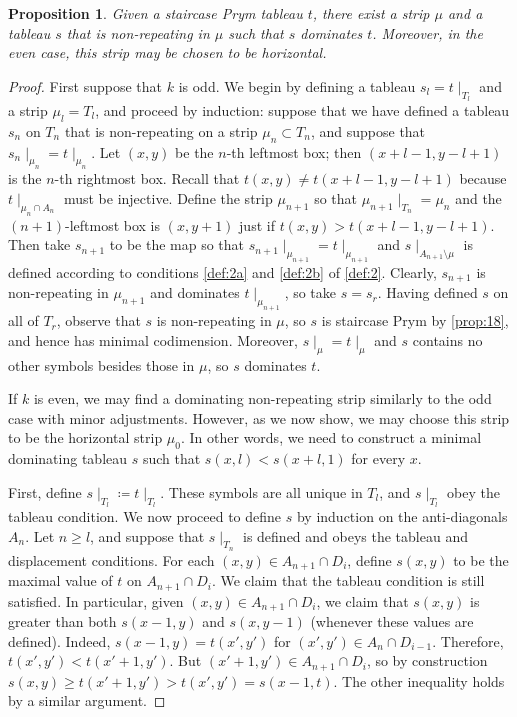 \documentclass[11pt,reqno]{amsart}
\newcommand*{\restrict}[1]{{\mid}_{#1}}
\theoremstyle{definition}
\theoremstyle{problem}
\theoremstyle{plain}
\newtheorem{proposition}[definition]{Proposition}
\theoremstyle{remark}
\theoremstyle{theorem}
\numberwithin{equation}{section}
\numberwithin{figure}{section}
\begin{document}
\begin{proposition}\label{prop:14}
  Given a staircase Prym tableau $t$, there exist a strip $\mu$ and a
  tableau $s$ that is non-repeating in $\mu$ such that $s$ dominates
  $t$. Moreover, in the even case, this strip may be chosen to be horizontal. 
\end{proposition}
\begin{proof}
	First suppose that $k$ is odd.  
  We begin by defining a tableau $s_l = t\restrict{T_l}$ and a
  strip $\mu_l = T_l$, and proceed by induction: suppose that we
  have defined a tableau $s_n$ on $T_n$ that is non-repeating on a
  strip $\mu_n \subset T_n$, and suppose that
  $s_n\restrict{\mu_n} = t\restrict{\mu_n}$.
  Let $(x,y)$ be the $n$-th leftmost
  box; then $(x+l-1,y-l+1)$ is the $n$-th rightmost box.  Recall that
  $t(x,y) \neq t(x+l-1,y-l+1)$ because $t\restrict{\mu_n \cap A_n}$
  must be injective.  Define the strip $\mu_{n+1}$ so that
  $\mu_{n+1}\restrict{T_n} = \mu_n$ and the $(n+1)$-leftmost box is
  $(x,y+1)$ just if $t(x,y) > t(x+l-1,y-l+1)$.  Then take $s_{n+1}$ to
  be the map so that
  $s_{n+1}\restrict{\mu_{n+1}} = t\restrict{\mu_{n+1}}$ and
  $s\restrict{A_{n+1} \setminus \mu}$ is defined according to
  conditions \ref{def:2a} and \ref{def:2b} of \cref{def:2}.  Clearly,
  $s_{n+1}$ is non-repeating in $\mu_{n+1}$ and dominates
  $t\restrict{\mu_{n+1}}$, so take $s = s_r$.
  Having defined $s$ on all of $T_r$, observe that $s$ is
  non-repeating in $\mu$, so $s$ is staircase Prym by \cref{prop:18},
  and hence has minimal codimension.  Moreover,
  $s\restrict{\mu} = t\restrict{\mu}$ and $s$ contains no other
  symbols besides those in $\mu$, so $s$ dominates $t$.

  If $k$ is even, we may find a dominating non-repeating strip similarly to the odd case with minor adjustments. However, as we now show, we may choose this strip to be the horizontal strip $\mu_0$. In other words, we need to construct a minimal dominating tableau $s$ such that $s(x,l)< s(x+l,1)$ for every $x$.

  First,
  define $s\restrict{T_l} \coloneq t\restrict{T_l}$.  These symbols are
  all unique in $T_l$, and $s\restrict{T_l}$ obey the tableau
  condition.
  We now proceed to define $s$ by induction on the anti-diagonals
  $A_n$.  Let $n \geq l$, and suppose that $s\restrict{T_n}$ is defined
  and obeys the tableau and displacement conditions.  For each
  $(x,y)\in A_{n+1} \cap D_i$, define $s(x,y)$ to be the maximal value
  of $t$ on $A_{n+1}\cap D_i$.  We claim that the tableau condition is
  still satisfied.  In particular, given $(x,y)\in A_{n+1} \cap D_i$,
  we claim that $s(x,y)$ is greater than both $s(x-1,y)$ and
  $s(x,y-1)$ (whenever these values are defined). Indeed, $s(x-1,y) = t(x',y')$ for
  $(x',y')\in A_n \cap D_{i-1}$. Therefore, $t(x',y')<
  t(x'+1,y')$. But $(x'+1,y')\in A_{n+1}\cap D_i$, so by construction
  $s(x,y)\geq t(x'+1,y')>t(x',y')=s(x-1,t)$.  The other inequality
  holds by a similar argument. 
  

\end{proof}
\end{document}
